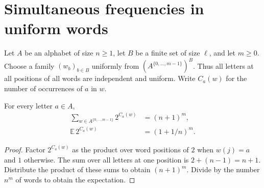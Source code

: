 \section{Simultaneous frequencies in uniform words}

Let $A$ be an alphabet of size $n\ge1$, let $B$ be a finite set of size $\ell$,
and let $m\ge0$. Choose a family $(w_b)_{b\in B}$ uniformly from
$(A^{\{0,\ldots,m-1\}})^B$. Thus all letters at all positions of all words are
independent and uniform. Write $C_a(w)$ for the number of occurrences of $a$ in $w$.

\begin{theorem}
    \label{thm:uniform_word_exponential_moment}
    \leanok
    For every letter $a\in A$,
    \begin{align}
        \sum_{w\in A^{\{0,\ldots,m-1\}}}2^{C_a(w)} & =(n+1)^m,   \\
        \mathbb E\,2^{C_a(w)}                      & =(1+1/n)^m.
        \label{eq:uniform_word_exponential_moment}
    \end{align}
\end{theorem}
\begin{proof}\leanok
    Factor $2^{C_a(w)}$ as the product over word positions of $2$ when
    $w(j)=a$ and $1$ otherwise. The sum over all letters at one position is
    $2+(n-1)=n+1$. Distribute the product of these sums to obtain $(n+1)^m$.
    Divide by the number $n^m$ of words to obtain the expectation.
\end{proof}

